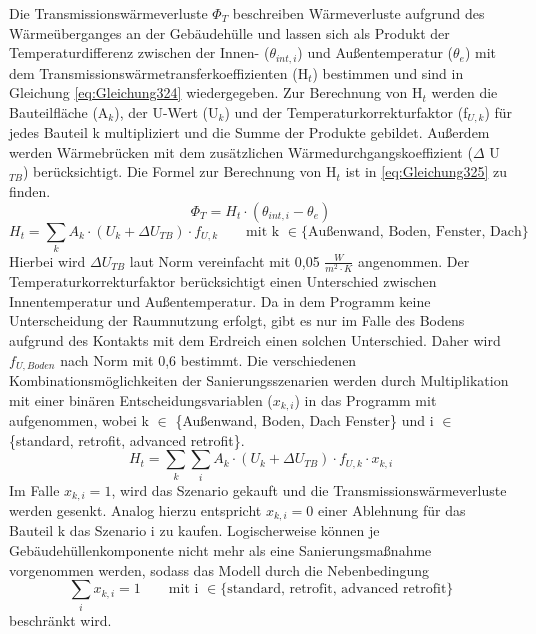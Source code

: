 Die Transmissionswärmeverluste \(\Phi_T\) beschreiben Wärmeverluste aufgrund des Wärmeüberganges an der Gebäudehülle und lassen sich als Produkt der Temperaturdifferenz zwischen der Innen- (\(\theta_{int, i}\)) und Außentemperatur (\(\theta_e\)) mit dem Transmissionswärmetransferkoeffizienten (H\(_t\)) bestimmen und sind in Gleichung \ref{eq:Gleichung324} wiedergegeben.
Zur Berechnung von H\(_t\) werden die Bauteilfläche (A\(_k\)), der U-Wert (U\(_k\)) und der Temperaturkorrekturfaktor (f\(_{U,k}\)) für jedes Bauteil k multipliziert und die Summe der Produkte gebildet.
Außerdem werden Wärmebrücken mit dem zusätzlichen Wärmedurchgangskoeffizient (\(\Delta\) U\(_{TB}\)) berücksichtigt.
Die Formel zur Berechnung von H\(_t\) ist in \ref{eq:Gleichung325} zu finden.
\begin{equation}
\label{eq:Gleichung324}
\Phi_T = H_t \cdot (\theta_{int, i} - \theta_e)
\end{equation}
\begin{equation}
\label{eq:Gleichung325}
H_t = \sum_{k} A_k \cdot (U_k + \Delta U_{TB}) \cdot f_{U,k} \qquad \text{mit k }\in \{\text{Außenwand, Boden, Fenster, Dach}\}
\end{equation}
Hierbei wird \(\Delta U_{TB}\) laut Norm vereinfacht mit 0,05 \(\frac{W}{m^2\cdot K}\) angenommen.
Der Temperaturkorrekturfaktor berücksichtigt einen Unterschied zwischen Innentemperatur und Außentemperatur.
Da in dem Programm keine Unterscheidung der Raumnutzung erfolgt, gibt es nur im Falle des Bodens aufgrund des Kontakts mit dem Erdreich einen solchen Unterschied.
Daher wird \(f_{U, Boden}\) nach Norm mit 0,6 bestimmt.
Die verschiedenen Kombinationsmöglichkeiten der Sanierungsszenarien werden durch Multiplikation mit einer binären Entscheidungsvariablen (\(x_{k, i}\)) in das Programm mit aufgenommen, wobei k \(\in\) \{Außenwand, Boden, Dach Fenster\} und i \(\in\) \{standard, retrofit, advanced retrofit\}.
\begin{equation}
\label{eq:Gleichung326}
H_t = \sum_{k} \sum_{i} A_k \cdot (U_k + \Delta U_{TB}) \cdot f_{U,k} \cdot x_{k, i}
\end{equation}
Im Falle \(x_{k, i} = 1\), wird das Szenario gekauft und die Transmissionswärmeverluste werden gesenkt.
Analog hierzu entspricht \(x_{k, i} = 0\) einer Ablehnung für das Bauteil k das Szenario i zu kaufen.
Logischerweise können je Gebäudehüllenkomponente nicht mehr als eine Sanierungsmaßnahme vorgenommen werden, sodass das Modell durch die Nebenbedingung 
\begin{equation}
\label{eq:Gleichung327}
\sum_{i} x_{k, i} = 1 \qquad \text{mit i } \in \{\text{standard, retrofit, advanced retrofit}\}
\end{equation}
beschränkt wird.

